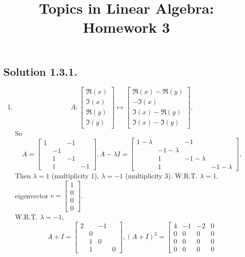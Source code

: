 \documentclass{article}
\title{Topics in Linear Algebra: Homework 3}
\begin{document}
\maketitle
\subsection*{Solution 1.3.1.}
\begin{enumerate}
    \item 
    \[A:\left[\begin{array}{r}
\Re(x) \\ \Im(x)\\\Re(y)\\\Im(y)\end{array}\right] \mapsto \left[\begin{array}{r}
\Re(x)-\Re(y) \\ -\Im(x)\\\Im(x)-\Re(y)\\\Im(x)-\Im(y)\end{array}\right],\]
So
\[A=\left[\begin{array}{rrrr}
1&&-1\\&-1\\&1&-1\\&1&&-1
\end{array}\right],A-\lambda I=\left[\begin{array}{rrrr}
1-\lambda&&-1\\&-1-\lambda\\&1&-1-\lambda\\&1&&-1-\lambda
\end{array}\right]
,\]
Then $\lambda = 1$ (multiplicity 1), $\lambda = -1$ (multiplicity 3).\newline
W.R.T. $\lambda = 1$, eigenvector $v = \left[\begin{array}{r}
1\\0\\0\\0\end{array}\right]$.\\
W.R.T. $\lambda = -1$, 
\[A+I=\left[\begin{array}{rrrr}
2&&-1\\&0\\&1&0\\&1&&0
\end{array}\right],(A+I)^2=\left[\begin{array}{rrrr}
4&-1&-2&0\\0&0&0&0\\0&0&0&0\\0&0&0&0

\end{array}\]
\end{enumerate}
\end{document}
